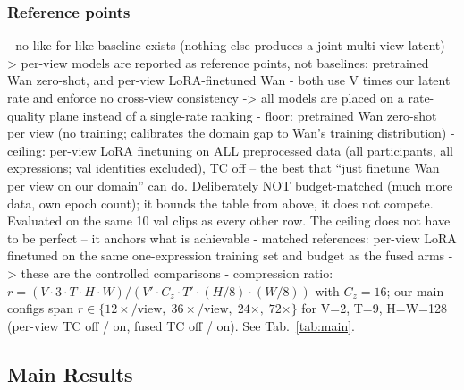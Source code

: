 \subsubsection{Reference points}

- no like-for-like baseline exists (nothing else produces a joint multi-view latent) -> per-view models are reported as reference points, not baselines: pretrained Wan zero-shot, and per-view LoRA-finetuned Wan
- both use V times our latent rate and enforce no cross-view consistency -> all models are placed on a rate-quality plane instead of a single-rate ranking
- floor: pretrained Wan zero-shot per view (no training; calibrates the domain gap to Wan's training distribution)
- ceiling: per-view LoRA finetuning on ALL preprocessed data (all participants, all expressions; val identities excluded), TC off -- the best that ``just finetune Wan per view on our domain'' can do. Deliberately NOT budget-matched (much more data, own epoch count); it bounds the table from above, it does not compete. Evaluated on the same 10 val clips as every other row. The ceiling does not have to be perfect -- it anchors what is achievable
- matched references: per-view LoRA finetuned on the same one-expression training set and budget as the fused arms -> these are the controlled comparisons
- compression ratio: $r = (V \cdot 3 \cdot T \cdot H \cdot W) / (V' \cdot C_z \cdot T' \cdot (H/8) \cdot (W/8))$ with $C_z = 16$; our main configs span $r \in \{12{\times}/\text{view},\; 36{\times}/\text{view},\; 24{\times},\; 72{\times}\}$ for V=2, T=9, H=W=128 (per-view TC off / on, fused TC off / on). See Tab.~\ref{tab:main}.

\subsection{Main Results}


